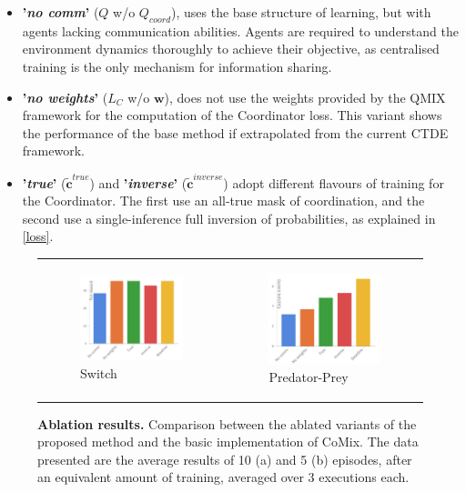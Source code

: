 \documentclass[a4paper,singleside,12pt]{report} %
\begin{document}
\begin{itemize}
  \item \textbf{'\textit{no comm}'} ($Q$ w/o $Q_{coord}$), uses the base structure of learning, but with agents lacking communication abilities. Agents are required to understand the environment dynamics thoroughly to achieve their objective, as centralised training is the only mechanism for information sharing.
  \item \textbf{'\textit{no weights}'} ($L_C$ w/o $\textbf{w}$), does not use the weights provided by the QMIX framework for the computation of the Coordinator loss. This variant shows the performance of the base method if extrapolated from the current CTDE framework.
  \item \textbf{'\textit{true}'} ($\tilde{\textbf{c}}^{true}$) and \textbf{'\textit{inverse}'} ($\tilde{\textbf{c}}^{inverse}$) adopt different flavours of training for the Coordinator. The first use an all-true mask of coordination, and the second use a single-inference full inversion of probabilities, as explained in \ref{loss}.
\end{itemize}

\begin{figure}
  \centering
  \begin{tabular}{p{4.5cm} p{4.5cm}}
  \begin{subfigure}[b]{5cm}
      \caption{Switch}
      \includegraphics[width=5cm]{images/ablation_switch.png}
  \end{subfigure} &
  \begin{subfigure}[b]{5cm}
      \caption{Predator-Prey}
      \includegraphics[width=5cm]{images/ablation_pursuit.png}
  \end{subfigure} \\
  \end{tabular}
  \caption{\textbf{Ablation results.} Comparison between the ablated variants of the proposed method and the basic implementation of CoMix. The data presented are the average results of 10 (a) and 5 (b) episodes, after an equivalent amount of training, averaged over 3 executions each.}
  \label{fig:ablation-res}
\end{figure}
\end{document}
